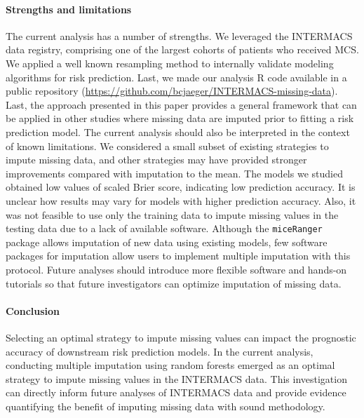 \documentclass{article}
\begin{document}
\paragraph{Strengths and limitations}

The current analysis has a number of strengths. We leveraged the
INTERMACS data registry, comprising one of the largest cohorts of
patients who received MCS. We applied a well known resampling method to
internally validate modeling algorithms for risk prediction. Last, we
made our analysis R code available in a public repository
(\url{https://github.com/bcjaeger/INTERMACS-missing-data}). Last, the
approach presented in this paper provides a general framework that can
be applied in other studies where missing data are imputed prior to
fitting a risk prediction model. The current analysis should also be
interpreted in the context of known limitations. We considered a small
subset of existing strategies to impute missing data, and other
strategies may have provided stronger improvements compared with
imputation to the mean. The models we studied obtained low values of
scaled Brier score, indicating low prediction accuracy. It is unclear
how results may vary for models with higher prediction accuracy. Also,
it was not feasible to use only the training data to impute missing
values in the testing data due to a lack of available software. Although
the \texttt{miceRanger} package allows imputation of new data using
existing models, few software packages for imputation allow users to
implement multiple imputation with this protocol. Future analyses should
introduce more flexible software and hands-on tutorials so that future
investigators can optimize imputation of missing data.

\paragraph{Conclusion}

Selecting an optimal strategy to impute missing values can impact the
prognostic accuracy of downstream risk prediction models. In the current
analysis, conducting multiple imputation using random forests emerged as
an optimal strategy to impute missing values in the INTERMACS data. This
investigation can directly inform future analyses of INTERMACS data and
provide evidence quantifying the benefit of imputing missing data with
sound methodology.
\end{document}
